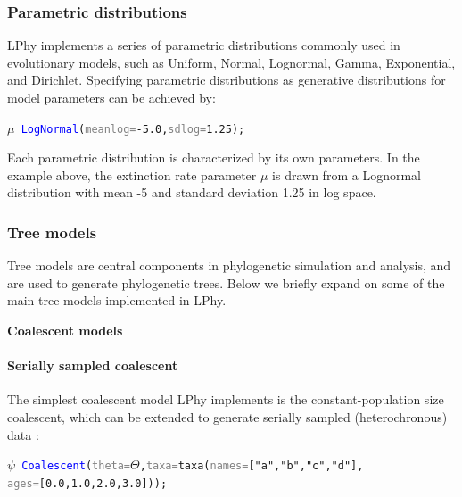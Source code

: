 \documentclass[10pt,letterpaper,table]{article}
\begin{document}
\subsubsection{Parametric distributions}
LPhy implements a series of parametric distributions commonly used in evolutionary models, such as Uniform, Normal, Lognormal, Gamma, Exponential, and Dirichlet. 
Specifying parametric distributions as generative distributions for model parameters can be achieved by:

{\small
\begin{alltt}
    \textcolor{bluishgreen}{\(\mu\)} ~ \textcolor{blue}{LogNormal}(\textcolor{gray}{meanlog=}\textcolor{constant}{-5.0}, \textcolor{gray}{sdlog=}\textcolor{constant}{1.25});
\end{alltt}}

Each parametric distribution is characterized by its own parameters. 
In the example above, the extinction rate parameter $\mu$ is drawn from a Lognormal distribution with mean -5 and standard deviation 1.25 in log space.

\subsubsection{Tree models}
\label{sec:treeprior}
Tree models are central components in phylogenetic simulation and analysis, and are used to generate phylogenetic trees. Below we briefly expand on some of the main tree models implemented in LPhy.
\newline

\noindent \textbf{Coalescent models}
\paragraph{Serially sampled coalescent}
The simplest coalescent model LPhy implements is the constant-population size coalescent, which can be extended to generate serially sampled (heterochronous) data \cite{Rodrigo1999SerialCoalescent}:
{\small
  \begin{alltt}
    \textcolor{bluishgreen}{\(\psi\)} ~ \textcolor{blue}{Coalescent}(\textcolor{gray}{theta=}\textcolor{bluishgreen}{\(\Theta\)}, \textcolor{gray}{taxa=}\textcolor{generator}{taxa}(\textcolor{gray}{names=}[\textcolor{constant}{"a"}, \textcolor{constant}{"b"}, \textcolor{constant}{"c"}, \textcolor{constant}{"d"}], 
      \textcolor{gray}{ages=}[\textcolor{constant}{0.0}, \textcolor{constant}{1.0}, \textcolor{constant}{2.0}, \textcolor{constant}{3.0}]));
  \end{alltt}
}
\end{document}
